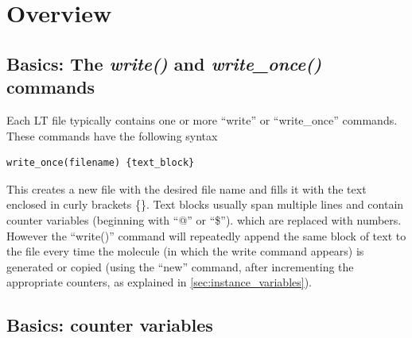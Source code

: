 \documentclass[11pt]{article}
\begin{document}

\section{Overview}

\subsection{Basics: The \textit{write()} and \textit{write\_once()} commands}
\label{sec:write}
Each LT file typically contains one or more 
``write'' or ``write\_once'' commands. 
These commands have the following syntax 
\begin{verbatim}
write_once(filename) {text_block}
\end{verbatim}
This creates a new file with the desired file name 
and fills it with the text enclosed in curly brackets \{\}.
Text blocks usually span multiple lines and contain counter variables 
(beginning with ``@'' or ``\$'').
which are replaced with numbers.
However the ``write()'' command will repeatedly append the 
same block of text to the file every time the molecule 
(in which the write command appears) is generated or copied 
(using the ``new'' command, 
after incrementing the appropriate counters,
as explained in \ref{sec:instance_variables}).


\subsection{Basics: counter variables}
\label{sec:variables}
\end{document}
